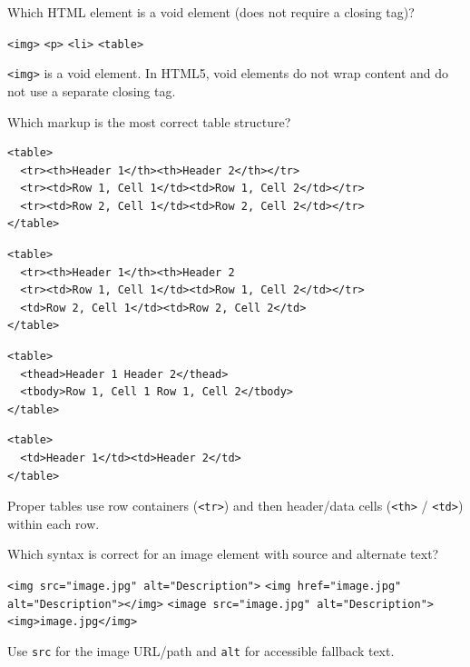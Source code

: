 \question[4]
Which HTML element is a void element (does not require a closing tag)?
\begin{choices}
  \CorrectChoice \texttt{<img>}
  \choice \texttt{<p>}
  \choice \texttt{<li>}
  \choice \texttt{<table>}
\end{choices}
\begin{solution}
  \texttt{<img>} is a void element. In HTML5, void elements do not wrap content and do not use a separate closing tag.
\end{solution}

\question[4]
Which markup is the most correct table structure?
\begin{choices}
  \CorrectChoice
\begin{lstlisting}[style=htmlexam]
<table>
  <tr><th>Header 1</th><th>Header 2</th></tr>
  <tr><td>Row 1, Cell 1</td><td>Row 1, Cell 2</td></tr>
  <tr><td>Row 2, Cell 1</td><td>Row 2, Cell 2</td></tr>
</table>
\end{lstlisting}
  \choice
\begin{lstlisting}[style=htmlexam]
<table>
  <tr><th>Header 1</th><th>Header 2
  <tr><td>Row 1, Cell 1</td><td>Row 1, Cell 2</td></tr>
  <td>Row 2, Cell 1</td><td>Row 2, Cell 2</td>
</table>
\end{lstlisting}
  \choice
\begin{lstlisting}[style=htmlexam]
<table>
  <thead>Header 1 Header 2</thead>
  <tbody>Row 1, Cell 1 Row 1, Cell 2</tbody>
</table>
\end{lstlisting}
  \choice
\begin{lstlisting}[style=htmlexam]
<table>
  <td>Header 1</td><td>Header 2</td>
</table>
\end{lstlisting}
\end{choices}
\begin{solution}
  Proper tables use row containers (\texttt{<tr>}) and then header/data cells (\texttt{<th>} / \texttt{<td>}) within each row.
\end{solution}

\question[4]
Which syntax is correct for an image element with source and alternate text?
\begin{choices}
  \CorrectChoice \texttt{<img src="image.jpg" alt="Description">}
  \choice \texttt{<img href="image.jpg" alt="Description"></img>}
  \choice \texttt{<image src="image.jpg" alt="Description">}
  \choice \texttt{<img>image.jpg</img>}
\end{choices}
\begin{solution}
  Use \texttt{src} for the image URL/path and \texttt{alt} for accessible fallback text.
\end{solution}

